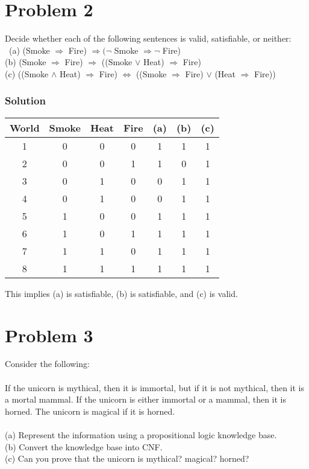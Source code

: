 \documentclass{article}
\begin{document}
\section*{Problem 2}
Decide whether each of the following sentences is valid, satisfiable, or neither: \
\indent (a) (Smoke $\Rightarrow$ Fire) $\Rightarrow (\neg$ Smoke $\Rightarrow \neg$ Fire) \\
\indent (b) (Smoke $\Rightarrow$ Fire) $\Rightarrow$ ((Smoke $\lor$ Heat) $\Rightarrow$ Fire) \\
\indent (c) ((Smoke $\land$ Heat) $\Rightarrow$ Fire) $\Leftrightarrow$ 
		((Smoke $\Rightarrow$ Fire) $\lor$ (Heat $\Rightarrow$ Fire))
\subsubsection*{Solution}
\begin{center}\begin{tabular}{ c | c c c c c c }
World & Smoke & Heat & Fire & (a) & (b) & (c) \\
\hline 
1 & 0 & 0 & 0 & 1 & 1 & 1 \\
2 & 0 & 0 & 1 & 1 & 0 & 1 \\
3 & 0 & 1 & 0 & 0 & 1 & 1 \\
4 & 0 & 1 & 0 & 0 & 1 & 1 \\
5 & 1 & 0 & 0 & 1 & 1 & 1 \\
6 & 1 & 0 & 1 & 1 & 1 & 1 \\
7 & 1 & 1 & 0 & 1 & 1 & 1 \\
8 & 1 & 1 & 1 & 1 & 1 & 1 \\
\end{tabular} \end{center}
This implies (a) is satisfiable, (b) is satisfiable, and (c) is valid.
\clearpage

\section*{Problem 3}
Consider the following: \ \\ \\
If the unicorn is mythical, then it is immortal, but if it is not mythical, then it is a mortal mammal. 
If the unicorn is either immortal or a mammal, then it is horned. 
The unicorn is magical if it is horned. \\ \\
\indent (a) Represent the information using a propositional logic knowledge base. \\
\indent (b) Convert the knowledge base into CNF. \\
\indent (c) Can you prove that the unicorn is mythical? magical? horned? \\
\end{document}
